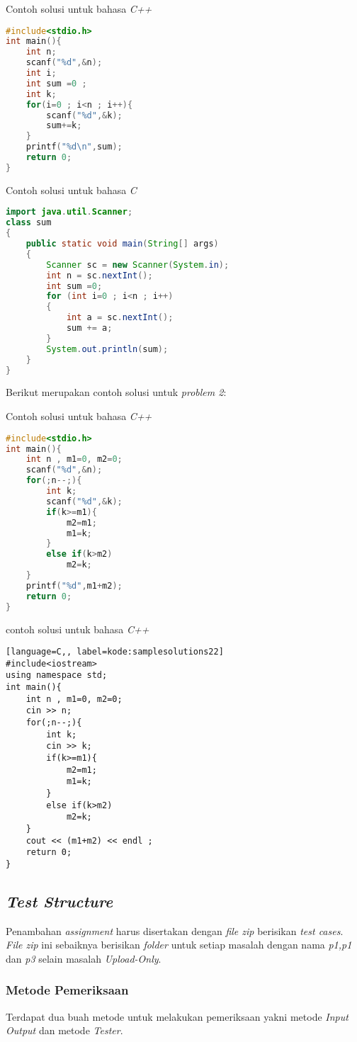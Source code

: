 Contoh solusi untuk bahasa \textit{C++}
\begin{lstlisting}[language=C, label=kode:samplesolutions2]
#include<stdio.h>
int main(){
	int n;
	scanf("%d",&n);
	int i;
	int sum =0 ;
	int k;
	for(i=0 ; i<n ; i++){
		scanf("%d",&k);
		sum+=k;
	}
	printf("%d\n",sum);
	return 0;
}
\end{lstlisting}

Contoh solusi untuk bahasa \textit{C}
\begin{lstlisting}[language=Java, label=kode:samplesolutions3]
import java.util.Scanner;
class sum
{
	public static void main(String[] args)
	{ 
		Scanner sc = new Scanner(System.in);
		int n = sc.nextInt();
		int sum =0;
		for (int i=0 ; i<n ; i++)
		{
			int a = sc.nextInt();
			sum += a;
		}
		System.out.println(sum); 
	}
}
\end{lstlisting}

Berikut merupakan contoh solusi untuk \textit{problem 2}:

Contoh solusi untuk bahasa \textit{C++}
\begin{lstlisting}[language=C,label=kode:samplesolutions21]
#include<stdio.h>
int main(){
	int n , m1=0, m2=0;
	scanf("%d",&n);
	for(;n--;){
		int k;
		scanf("%d",&k);
		if(k>=m1){
			m2=m1;
			m1=k;
		}
		else if(k>m2)
			m2=k;
	}
	printf("%d",m1+m2);
	return 0;
}
\end{lstlisting}

contoh solusi untuk bahasa \textit{C++}
\begin{lstlisting}[language=C,, label=kode:samplesolutions22]
#include<iostream>
using namespace std;
int main(){
	int n , m1=0, m2=0;
	cin >> n;
	for(;n--;){
		int k;
		cin >> k;
		if(k>=m1){
			m2=m1;
			m1=k;
		}
		else if(k>m2)
			m2=k;
	}
	cout << (m1+m2) << endl ;
	return 0;
}
\end{lstlisting}

\subsection{\textit{Test Structure}}
\label{subsec:testStructure}
Penambahan \textit{assignment} harus disertakan dengan \textit{file zip} berisikan \textit{test cases}. \textit{File zip} ini sebaiknya berisikan \textit{folder} untuk setiap masalah dengan nama \textit{p1,p1} dan \textit{p3} selain masalah \textit{Upload-Only}.

\subsubsection{Metode Pemeriksaan}
Terdapat dua buah metode untuk melakukan pemeriksaan yakni metode \textit{Input Output} dan metode \textit{Tester}.

